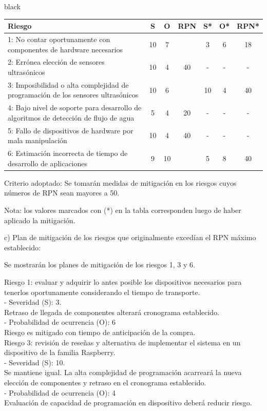 \documentclass[
11pt, %
codirector, %
]{charter}
\begin{document}
\begin{consigna}{black}
\begin{table}[htpb]
\centering
\begin{tabularx}{\linewidth}{@{}|X|c|c|c|c|c|c|@{}}
\hline
\rowcolor[HTML]{C0C0C0} 
Riesgo & S & O & RPN &	 S* & O* & RPN* \\ \hline
1: No contar oportunamente con componentes de hardware necesarios   & 10  &  7 & \cellcolor{red}{70}  &  3  & 6   & 18     \\ \hline
2: Errónea elección de sensores ultrasónicos       & 10  &  4 & 40    &  -  &  -  &  -    \\ \hline
3: Imposibilidad o alta complejidad de programación de los sensores ultrasónicos       & 10  &  6 & \cellcolor{red}{60}  & 10   & 4   & 40     \\ \hline
4: Bajo nivel de soporte para desarrollo de algoritmos de detección de flujo de agua       &  5 & 4  & 20  & -   & -   & -     \\ \hline
5: Fallo de dispositivos de hardware por mala manipulación       & 10  & 4  & 40    & -   & -   & -     \\ \hline
6: Estimación incorrecta de tiempo de desarrollo de aplicaciones       &  9   & 10  & \cellcolor{red}{90}    & 5   & 8   & 40     \\ \hline
\end{tabularx}%
\end{table}

Criterio adoptado: 
Se tomarán medidas de mitigación en los riesgos cuyos números de RPN sean mayores a 50.

Nota: los valores marcados con (*) en la tabla corresponden luego de haber aplicado la mitigación.

c) Plan de mitigación de los riesgos que originalmente excedían el RPN máximo establecido:
 
Se mostrarán los planes de mitigación de los riesgos 1, 3 y 6. 
 
Riesgo 1: evaluar y adquirir lo antes posible los dispositivos necesarios para tenerlos oportunamente considerando el tiempo de transporte. \\
  - Severidad (S): 3. \\
	Retraso de llegada de componentes alterará cronograma establecido. \\
  - Probabilidad de ocurrencia (O): 6 \\
	Riesgo es mitigado con tiempo de anticipación de la compra. \\

Riesgo 3: revisión de reseñas y alternativa de implementar el sistema en un dispositivo de la familia Raspberry. \\
  - Severidad (S): 10. \\
	Se mantiene igual. La alta complejidad de programación acarreará la nueva elección de componentes y retraso en el cronograma establecido. \\
  - Probabilidad de ocurrencia (O): 4 \\
	Evaluación de capacidad de programación en dispositivo deberá reducir riesgo. \\


\end{consigna}
\end{document}
